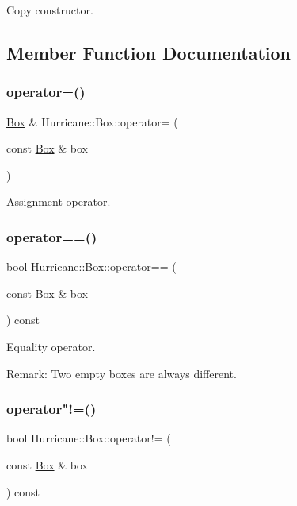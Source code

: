 Copy constructor. 

\subsection{Member Function Documentation}
\mbox{\label{classHurricane_1_1Box_a01abf59b3d3e99e694a7d4789f1bb978}} 
\subsubsection{\texorpdfstring{operator=()}{operator=()}}
{\footnotesize\ttfamily \mbox{\hyperlink{classHurricane_1_1Box}{Box}} \& Hurricane\+::\+Box\+::operator= (\begin{DoxyParamCaption}\item[{const \mbox{\hyperlink{classHurricane_1_1Box}{Box}} \&}]{box }\end{DoxyParamCaption})}

Assignment operator. \mbox{\label{classHurricane_1_1Box_a2a363ad0fdfda5a2f56b1b62a8665703}} 
\subsubsection{\texorpdfstring{operator==()}{operator==()}}
{\footnotesize\ttfamily bool Hurricane\+::\+Box\+::operator== (\begin{DoxyParamCaption}\item[{const \mbox{\hyperlink{classHurricane_1_1Box}{Box}} \&}]{box }\end{DoxyParamCaption}) const}

Equality operator.

\begin{DoxyParagraph}{Remark\+: Two empty boxes are always different. }

\end{DoxyParagraph}
\mbox{\label{classHurricane_1_1Box_a77a0e8c424c246973c455ce8e3ada8fb}} 
\subsubsection{\texorpdfstring{operator"!=()}{operator!=()}}
{\footnotesize\ttfamily bool Hurricane\+::\+Box\+::operator!= (\begin{DoxyParamCaption}\item[{const \mbox{\hyperlink{classHurricane_1_1Box}{Box}} \&}]{box }\end{DoxyParamCaption}) const}

